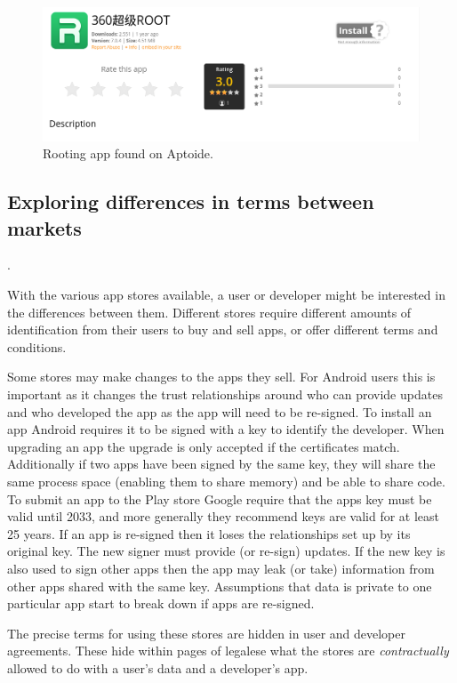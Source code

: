 \documentclass[thesis.tex]{subfiles}
\begin{document}
\begin{figure}
  \centering
  \includegraphics[width=0.8\linewidth]{figures/aptoide-root.png}
  \caption{Rooting app found on Aptoide.}
  \label{fig:aptoide-root}
\end{figure}


\subsection{Exploring differences in terms between markets}.

With the various app stores available, a user or developer might be
interested in the differences between them.  Different stores require
different amounts of identification from their users to buy and sell
apps, or offer different terms and conditions.

Some stores may make changes to the apps they sell.  For Android users
this is important as it changes the trust relationships around who can
provide updates and who developed the app as the app will need to be
re-signed.  To install an app Android requires it to be signed with a
key to identify the developer.  When upgrading an app the upgrade is
only accepted if the certificates match.  Additionally if two apps
have been signed by the same key, they will share the same process
space (enabling them to share memory) and be able to share code. To
submit an app to the Play store Google require that the apps key must
be valid until 2033, and more generally they recommend keys are valid
for at least 25 years.  If an app is re-signed then it loses the
relationships set up by its original key. The new signer must provide
(or re-sign) updates.  If the new key is also used to sign other apps
then the app may leak (or take) information from other apps shared
with the same key.  Assumptions that data is private to one particular
app start to break down if apps are re-signed.

The precise terms for using these stores are hidden in user and
developer agreements.  These hide within pages of legalese what the
stores are \emph{contractually} allowed to do with a user's data and a
developer's app.
\end{document}
